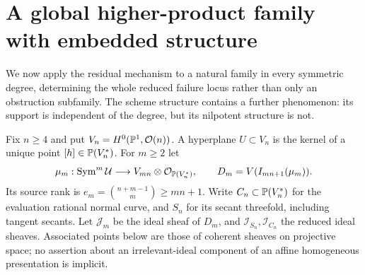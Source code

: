 \section{A global higher-product family with embedded structure}
\label{sec:higher-hyperplane-classification}
We now apply the residual mechanism to a natural family in every
symmetric degree, determining the whole reduced failure locus rather
than only an obstruction subfamily. The scheme structure contains a
further phenomenon: its support is independent of the degree, but
its nilpotent structure is not.

Fix $n\ge4$ and put $V_n=H^0(\mathbb P^1,\mathcal O(n))$. A hyperplane
$U\subset V_n$ is the kernel of a unique point $[h]\in\mathbb P(V_n^*)$.
For $m\ge2$ let
\[
 \mu_m:\operatorname{Sym}^m\mathcal U\longrightarrow
          V_{mn}\otimes\mathcal O_{\mathbb P(V_n^*)},\qquad
 D_m=V(I_{mn+1}(\mu_m)).
\]
Its source rank is $e_m=\binom{n+m-1}{m}\ge mn+1$.
Write $C_n\subset\mathbb P(V_n^*)$ for the evaluation rational normal
curve, and $S_n$ for its secant threefold, including tangent secants.
Let $\mathcal J_m$ be the ideal sheaf of $D_m$, and
$\mathcal I_{S_n},\mathcal I_{C_n}$ the reduced ideal sheaves.
Associated points below are those of coherent sheaves on projective
space; no assertion about an irrelevant-ideal component of an affine
homogeneous presentation is implicit.

